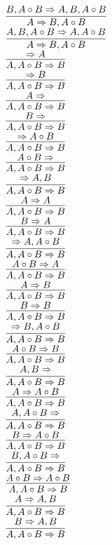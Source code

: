 \documentclass[11pt]{article}
\begin{document}
\begin{center}
\bigskip
\\$\infer{A\Rightarrow B, A\circ B}{B, A\circ B\Rightarrow A, B, A\circ B}$
\bigskip
\\$\infer{A\Rightarrow B, A\circ B}{A, B, A\circ B\Rightarrow A, A\circ B}$
\bigskip
\\$\infer{A, A\circ B\Rightarrow B}{\Rightarrow A}$
\bigskip
\\$\infer{A, A\circ B\Rightarrow B}{\Rightarrow B}$
\bigskip
\\$\infer{A, A\circ B\Rightarrow B}{A\Rightarrow }$
\bigskip
\\$\infer{A, A\circ B\Rightarrow B}{B\Rightarrow }$
\bigskip
\\$\infer{A, A\circ B\Rightarrow B}{\Rightarrow A\circ B}$
\bigskip
\\$\infer{A, A\circ B\Rightarrow B}{A\circ B\Rightarrow }$
\bigskip
\\$\infer{A, A\circ B\Rightarrow B}{\Rightarrow A, B}$
\bigskip
\\$\infer{A, A\circ B\Rightarrow B}{A\Rightarrow A}$
\bigskip
\\$\infer{A, A\circ B\Rightarrow B}{B\Rightarrow A}$
\bigskip
\\$\infer{A, A\circ B\Rightarrow B}{\Rightarrow A, A\circ B}$
\bigskip
\\$\infer{A, A\circ B\Rightarrow B}{A\circ B\Rightarrow A}$
\bigskip
\\$\infer{A, A\circ B\Rightarrow B}{A\Rightarrow B}$
\bigskip
\\$\infer{A, A\circ B\Rightarrow B}{B\Rightarrow B}$
\bigskip
\\$\infer{A, A\circ B\Rightarrow B}{\Rightarrow B, A\circ B}$
\bigskip
\\$\infer{A, A\circ B\Rightarrow B}{A\circ B\Rightarrow B}$
\bigskip
\\$\infer{A, A\circ B\Rightarrow B}{A, B\Rightarrow }$
\bigskip
\\$\infer{A, A\circ B\Rightarrow B}{A\Rightarrow A\circ B}$
\bigskip
\\$\infer{A, A\circ B\Rightarrow B}{A, A\circ B\Rightarrow }$
\bigskip
\\$\infer{A, A\circ B\Rightarrow B}{B\Rightarrow A\circ B}$
\bigskip
\\$\infer{A, A\circ B\Rightarrow B}{B, A\circ B\Rightarrow }$
\bigskip
\\$\infer{A, A\circ B\Rightarrow B}{A\circ B\Rightarrow A\circ B}$
\bigskip
\\$\infer{A, A\circ B\Rightarrow B}{A\Rightarrow A, B}$
\bigskip
\\$\infer{A, A\circ B\Rightarrow B}{B\Rightarrow A, B}$

\end{center}
\end{document}
